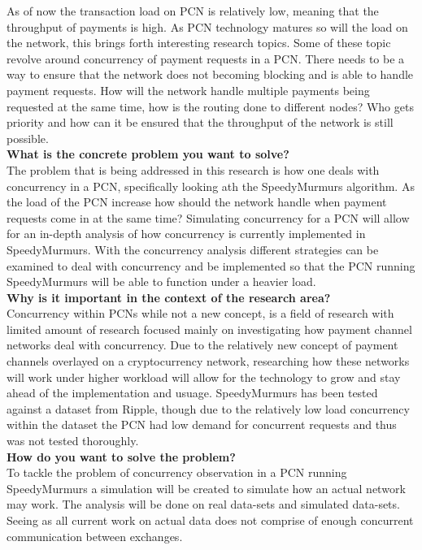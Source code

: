 \documentclass{article}
\begin{document}
As of now the transaction load on PCN is relatively low, meaning that the throughput of payments is high. As PCN technology matures so will the load on the network, this brings forth interesting research topics. Some of these topic revolve around concurrency of payment requests in a PCN. There needs to be a way to ensure that the network does not becoming blocking and is able to handle payment requests. How will the network handle multiple payments being requested at the same time, how is the routing done to different nodes? Who gets priority and how can it be ensured that the throughput of the network is still possible.\\

\textbf{What is the concrete problem you want to solve?} \\

The problem that is being addressed in this research is how one deals with concurrency in a PCN, specifically looking ath the SpeedyMurmurs algorithm. As the load of the PCN increase how should the network handle when payment requests come in at the same time? Simulating concurrency for a PCN will allow for an in-depth analysis of how concurrency is currently implemented in SpeedyMurmurs. With the concurrency analysis different strategies can be examined to deal with concurrency and be implemented so that the PCN running SpeedyMurmurs will be able to function under a heavier load. \\

\textbf{Why is it important in the context of the research area?} \\

Concurrency within PCNs while not a new concept, is a field of research with limited amount of research focused mainly on investigating how payment channel networks deal with concurrency. Due to the relatively new concept of payment channels overlayed on a cryptocurrency network, researching how these networks will work under higher workload will allow for the technology to grow and stay ahead of the implementation and usuage. SpeedyMurmurs has been tested against a dataset from Ripple, though due to the relatively low load concurrency within the dataset the PCN had low demand for concurrent requests and thus was not tested thoroughly. \\


\textbf{How do you want to solve the problem?} \\

To tackle the problem of concurrency observation in a PCN running SpeedyMurmurs a simulation will be created to simulate how an actual network may work. The analysis will be done on real data-sets and simulated data-sets. Seeing as all current work on actual data does not comprise of enough concurrent communication between exchanges. \\
\end{document}
